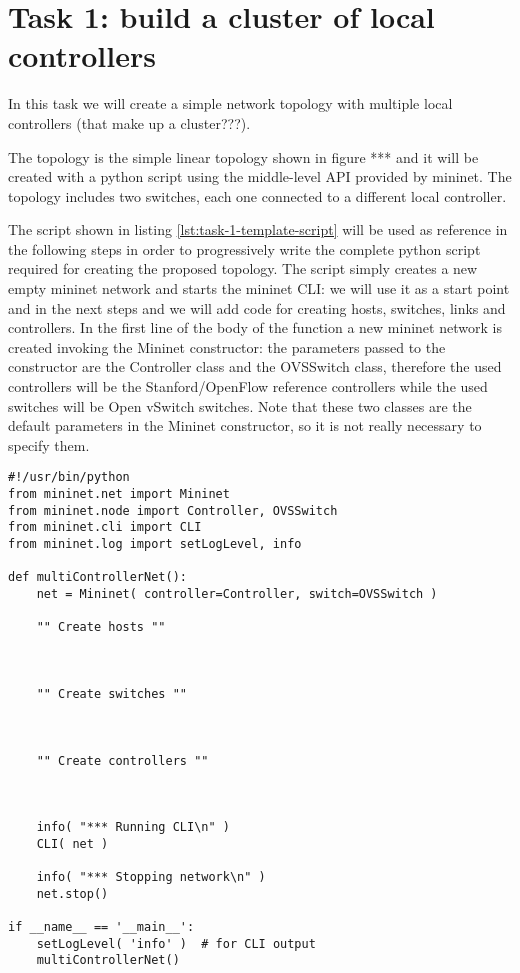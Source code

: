 \section{Task 1: build a cluster of local controllers}
In this task we will create a simple network topology with multiple local controllers
(that make up a cluster???).

The topology is the simple linear topology shown in figure *** and it will be
created with a python script using the middle-level API provided by mininet. The
topology includes two switches, each one connected to a different local controller.

The script shown in listing \ref{lst:task-1-template-script} will be used as reference
in the following steps in order to progressively write the complete python script
required for creating the proposed topology. The script simply creates a new empty mininet network and starts the mininet CLI:
we will use it as a start point and in the next steps and we will add code for creating hosts,
switches, links and controllers. In the first line of the body of the function 
a new mininet network is created invoking the Mininet constructor: the parameters
passed to the constructor are the Controller class and the OVSSwitch class, therefore
the used controllers will be the Stanford/OpenFlow reference controllers while
the used switches will be Open vSwitch switches. Note that these two classes are
the default parameters in the Mininet constructor, so it is not really necessary
to specify them.

\begin{minipage}{\linewidth}
\begin{lstlisting}[label=lst:task-1-template-script, caption=task 1 reference python script]
#!/usr/bin/python
from mininet.net import Mininet
from mininet.node import Controller, OVSSwitch
from mininet.cli import CLI
from mininet.log import setLogLevel, info

def multiControllerNet():
    net = Mininet( controller=Controller, switch=OVSSwitch )

    "" Create hosts ""



    "" Create switches ""



    "" Create controllers ""



    info( "*** Running CLI\n" )
    CLI( net )

    info( "*** Stopping network\n" )
    net.stop()

if __name__ == '__main__':
    setLogLevel( 'info' )  # for CLI output
    multiControllerNet()
\end{lstlisting}
\end{minipage}



